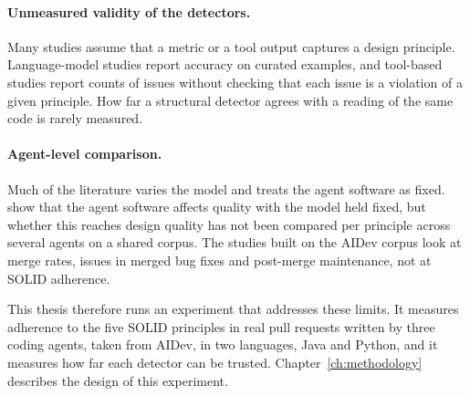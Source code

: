 \paragraph{Unmeasured validity of the detectors.} Many studies assume that a metric or a tool
output captures a design principle. Language-model studies report accuracy on curated examples, and
tool-based studies report counts of issues without checking that each issue is a violation of a given
principle. How far a structural detector agrees with a reading of the same code is rarely measured.

\paragraph{Agent-level comparison.} Much of the literature varies the model and treats the agent
software as fixed. \citet{bensghaier2026harness} show that the agent software affects quality with
the model held fixed, but whether this reaches design quality has not been compared per principle
across several agents on a shared corpus. The studies built on the AIDev corpus look at merge rates,
issues in merged bug fixes and post-merge maintenance, not at SOLID adherence.

This thesis therefore runs an experiment that addresses these limits. It measures adherence to the
five SOLID principles in real pull requests written by three coding agents, taken from AIDev, in two
languages, Java and Python, and it measures how far each detector can be trusted. Chapter~\ref{ch:methodology}
describes the design of this experiment.
